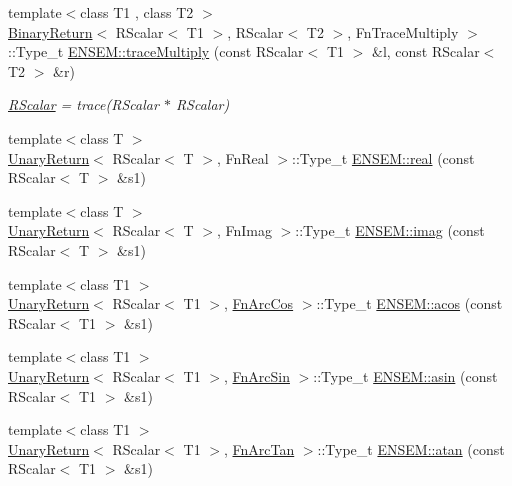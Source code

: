 \begin{DoxyCompactItemize}
\item 
{\footnotesize template$<$class T1 , class T2 $>$ }\\\mbox{\hyperlink{structBinaryReturn}{Binary\+Return}}$<$ R\+Scalar$<$ T1 $>$, R\+Scalar$<$ T2 $>$, Fn\+Trace\+Multiply $>$\+::Type\+\_\+t \mbox{\hyperlink{group__rscalar_ga04705f685567963d28806500dd6dde85}{E\+N\+S\+E\+M\+::trace\+Multiply}} (const R\+Scalar$<$ T1 $>$ \&l, const R\+Scalar$<$ T2 $>$ \&r)
\begin{DoxyCompactList}\small\item\em \mbox{\hyperlink{classENSEM_1_1RScalar}{R\+Scalar}} = trace(\+R\+Scalar $\ast$ R\+Scalar) \end{DoxyCompactList}\item 
{\footnotesize template$<$class T $>$ }\\\mbox{\hyperlink{structUnaryReturn}{Unary\+Return}}$<$ R\+Scalar$<$ T $>$, Fn\+Real $>$\+::Type\+\_\+t \mbox{\hyperlink{group__rscalar_ga50a51e948d621f811040859a236b48f9}{E\+N\+S\+E\+M\+::real}} (const R\+Scalar$<$ T $>$ \&s1)
\item 
{\footnotesize template$<$class T $>$ }\\\mbox{\hyperlink{structUnaryReturn}{Unary\+Return}}$<$ R\+Scalar$<$ T $>$, Fn\+Imag $>$\+::Type\+\_\+t \mbox{\hyperlink{group__rscalar_ga4ab56867e71bfd12d8b60d8f60010c73}{E\+N\+S\+E\+M\+::imag}} (const R\+Scalar$<$ T $>$ \&s1)
\item 
{\footnotesize template$<$class T1 $>$ }\\\mbox{\hyperlink{structUnaryReturn}{Unary\+Return}}$<$ R\+Scalar$<$ T1 $>$, \mbox{\hyperlink{structFnArcCos}{Fn\+Arc\+Cos}} $>$\+::Type\+\_\+t \mbox{\hyperlink{group__rscalar_gad83b7c66ca2adeacdccb66ae00e407c9}{E\+N\+S\+E\+M\+::acos}} (const R\+Scalar$<$ T1 $>$ \&s1)
\item 
{\footnotesize template$<$class T1 $>$ }\\\mbox{\hyperlink{structUnaryReturn}{Unary\+Return}}$<$ R\+Scalar$<$ T1 $>$, \mbox{\hyperlink{structFnArcSin}{Fn\+Arc\+Sin}} $>$\+::Type\+\_\+t \mbox{\hyperlink{group__rscalar_ga74e5212c5ef434f0f0f94bf61b79f0fb}{E\+N\+S\+E\+M\+::asin}} (const R\+Scalar$<$ T1 $>$ \&s1)
\item 
{\footnotesize template$<$class T1 $>$ }\\\mbox{\hyperlink{structUnaryReturn}{Unary\+Return}}$<$ R\+Scalar$<$ T1 $>$, \mbox{\hyperlink{structFnArcTan}{Fn\+Arc\+Tan}} $>$\+::Type\+\_\+t \mbox{\hyperlink{group__rscalar_ga540f6e66ddf6d73bc001906c1578e737}{E\+N\+S\+E\+M\+::atan}} (const R\+Scalar$<$ T1 $>$ \&s1)

\end{DoxyCompactItemize}
